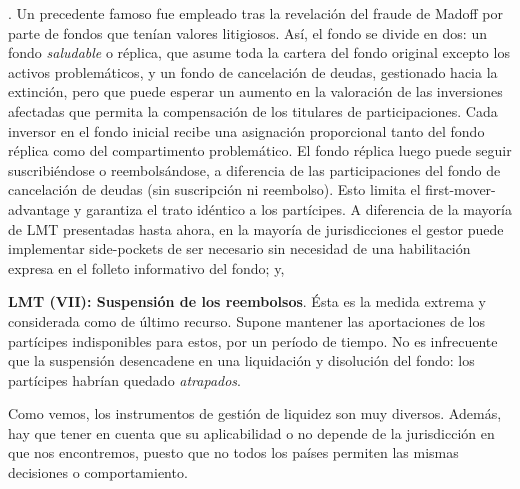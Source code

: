 \documentclass[10pt,a4paper]{article}
\newcounter{numitem}
\newenvironment{lnum}
      {\begin{list}{\arabic{numitem}.}{%
          \usecounter{numitem}%
          \setlength{\leftmargin}{1cm}%
          \setlength{\parskip}{3pt}%
          \setlength{\itemsep}{0pt}%
          \setlength{\parsep}{0pt}%
      }}
      {\end{list}}
\begin{document}
\begin{lnum}
{        Un precedente famoso fue empleado tras la revelación del fraude de Madoff por parte de fondos que tenían valores litigiosos.
    } Así, el fondo se divide en dos: un fondo \textit{saludable} o réplica, que asume toda la cartera del fondo original excepto los activos problemáticos, y un fondo de cancelación de deudas, gestionado hacia la extinción, pero que puede esperar un aumento en la valoración de las inversiones afectadas que permita la compensación de los titulares de participaciones. Cada inversor en el fondo inicial recibe una asignación proporcional tanto del fondo réplica como del compartimento problemático. El fondo réplica luego puede seguir suscribiéndose o reembolsándose, a diferencia de las participaciones del fondo de cancelación de deudas (sin suscripción ni reembolso). Esto limita el first-mover-advantage y garantiza el trato idéntico a los partícipes. A diferencia de la mayoría de LMT presentadas hasta ahora, en la mayoría de jurisdicciones el gestor puede implementar side-pockets de ser necesario sin necesidad de una habilitación expresa en el folleto informativo del fondo; y,
    \item \textbf{LMT (VII): Suspensión de los reembolsos}. Ésta es la medida extrema y considerada como de último recurso. Supone mantener las aportaciones de los partícipes indisponibles para estos, por un período de tiempo. No es infrecuente que la suspensión desencadene en una liquidación y disolución del fondo: los partícipes habrían quedado \textit{atrapados}.
\end{lnum}

Como vemos, los instrumentos de gestión de liquidez son muy diversos. Además, hay que tener en cuenta que su aplicabilidad o no depende de la jurisdicción en que nos encontremos, puesto que no todos los países permiten las mismas decisiones o comportamiento.
\end{document}
